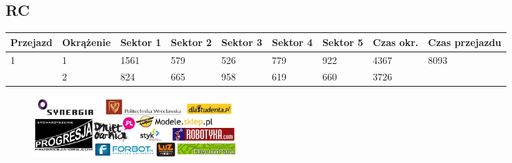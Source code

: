 \documentclass[11pt]{article}
\begin{document}
\subsection{RC}
\begin{table}[h]
\begin{tabular}{|l|l|l|l|l|l|l|l|l|}
\hline
 Przejazd        & Okrążenie & Sektor 1 & Sektor 2 & Sektor 3 & Sektor 4 & Sektor 5 & Czas okr. & Czas przejazdu    \\ \hline
\multirow{2}{*}{1}& 1 &1561& 579& 526& 779& 922& 4367& \multirow{2}{*}{8093} \\ \cline{2-8}
& 2& 824& 665& 958& 619& 660& 3726& \\ \hline
\end{tabular}
\end{table}
\clearpage
\newpage
\begin{figure}
\centering
\includegraphics[width=300px, keepaspectratio=true]
{images/sponsors.jpg}
\end{figure}
\end{document}
